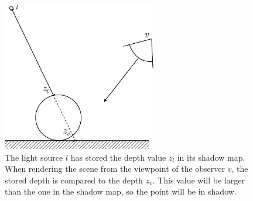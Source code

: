 \begin{figure}[h]
	\centering
	\includegraphics[width=0.6\textwidth]{./graf/shadow_mapping_basic.pdf}
	\caption{The light source \(l\) has stored the depth value \(z_l\) in its shadow map. When rendering the scene from the viewpoint of the observer \(v\), the stored depth is compared to the depth \(z_v\). This value will be larger than the one in the shadow map, so the point will be in shadow.}
	\label{fig:shadow_map_basic}
\end{figure}

